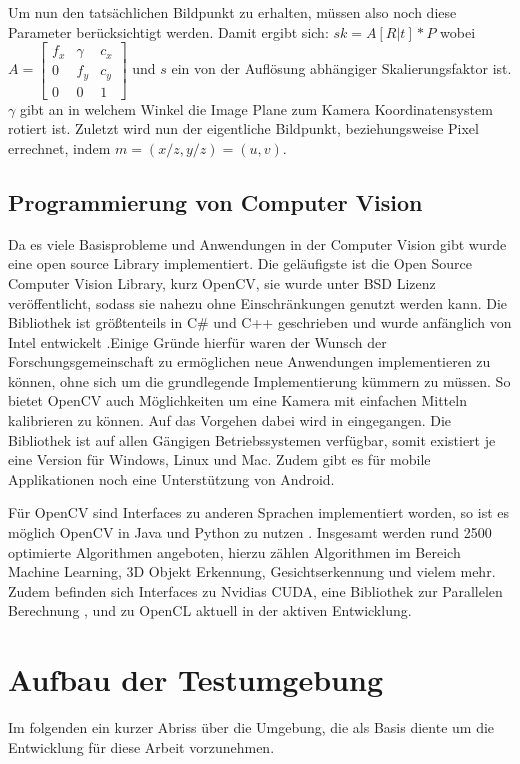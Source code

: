 Um nun den tatsächlichen Bildpunkt zu erhalten, müssen also noch diese Parameter berücksichtigt werden. Damit ergibt sich:
$sk = A [R | t] * P 
$
wobei $A = \begin{bmatrix} f_x & \gamma & c_x \\
                             0 &  f_y   & c_y \\
                             0 &  0     &  1\end{bmatrix}$ und $s$ ein von der Auflösung abhängiger Skalierungsfaktor ist. $\gamma$ gibt an in welchem Winkel die Image Plane zum Kamera Koordinatensystem rotiert ist. Zuletzt wird nun der eigentliche Bildpunkt, beziehungsweise Pixel errechnet, indem $m=(x/z, y/z)=(u,v)$.



\subsection{Programmierung von Computer Vision}
\label{sec:opencv}
Da es viele Basisprobleme und Anwendungen in der Computer Vision gibt wurde eine open source Library implementiert. Die geläufigste ist die Open Source Computer Vision Library, kurz OpenCV, sie wurde unter BSD Lizenz veröffentlicht, sodass sie nahezu ohne Einschränkungen genutzt werden kann. Die Bibliothek ist größtenteils in C\# und C++  geschrieben und wurde anfänglich von Intel entwickelt \textbf{\autocite[512--]{Medioni:2004:ETC:993884} }.Einige Gründe hierfür waren der Wunsch der Forschungsgemeinschaft zu ermöglichen neue Anwendungen implementieren zu können, ohne sich um die grundlegende Implementierung kümmern zu müssen. So bietet OpenCV auch Möglichkeiten um eine Kamera mit einfachen Mitteln kalibrieren zu können. Auf das Vorgehen dabei wird in  eingegangen.
Die Bibliothek ist auf allen Gängigen Betriebssystemen verfügbar, somit existiert je eine Version für Windows, Linux und Mac. Zudem gibt es für mobile Applikationen noch eine Unterstützung von Android.

Für OpenCV sind Interfaces zu anderen Sprachen implementiert worden, so ist es möglich OpenCV in Java und Python zu nutzen \autocite{OpenCV2016}. Insgesamt werden rund 2500 optimierte Algorithmen angeboten, hierzu zählen Algorithmen im Bereich Machine Learning, 3D Objekt Erkennung, Gesichtserkennung und vielem mehr. Zudem befinden sich Interfaces zu Nvidias CUDA, eine Bibliothek zur Parallelen Berechnung \autocite{cuda2017}, und zu OpenCL aktuell in der aktiven Entwicklung.


\section{Aufbau der Testumgebung}
\label{sec:setup}
Im folgenden ein kurzer Abriss über die Umgebung, die als Basis diente um die Entwicklung für diese Arbeit vorzunehmen. 



